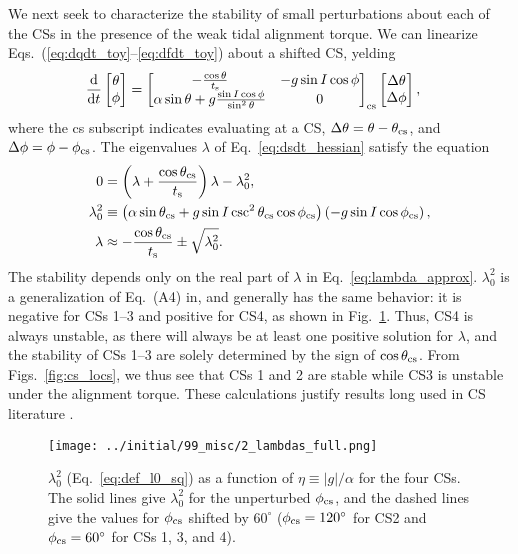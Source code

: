 \documentclass[
        fleqn,
        usenatbib,
    ]{mnras}
\newcommand*{\rd}[2]{\frac{\mathrm{d}#1}{\mathrm{d}#2}}
\newcommand*{\abs}[1]{\left|#1\right|}
\newcommand*{\p}[1]{\left(#1\right)}
\begin{document}
We next seek to characterize the stability of small perturbations about each of
the CSs in the presence of the weak tidal alignment torque. We can linearize
Eqs.~(\ref{eq:dqdt_toy}--\ref{eq:dfdt_toy}) about a shifted CS, yelding
\begin{align}
    \rd{}{t}\begin{bmatrix}
        \theta\\ \phi
    \end{bmatrix} &= \begin{bmatrix}
        -\frac{\cos \theta}{t_{\rm s}} &
        -g\sin I \cos \phi \\
        \alpha \sin \theta + g\frac{\sin I \cos \phi}{\sin^2\theta} &
        0
    \end{bmatrix}_{\rm cs}\begin{bmatrix}
        \Delta \theta \\ \Delta \phi
    \end{bmatrix},\label{eq:dsdt_hessian}
\end{align}
where the cs subscript indicates evaluating at a CS, $\Delta \theta = \theta -
\theta_{\rm cs}$, and $\Delta \phi = \phi - \phi_{\rm cs}$. The eigenvalues
$\lambda$ of Eq.~\eqref{eq:dsdt_hessian} satisfy the equation
\begin{align}
    0 &= \p{\lambda + \frac{\cos \theta_{\rm cs}}{t_{\rm s}}}\lambda - \lambda_0^2,\\
    \lambda_0^2 &\equiv \p{\alpha
        \sin \theta_{\rm cs} + g\sin I \csc^2\theta_{\rm cs}\cos \phi_{\rm cs}}
            \p{- g \sin I \cos \phi_{\rm cs}},\label{eq:def_l0_sq}\\
    \lambda &\approx -\frac{\cos \theta_{\rm cs}}{t_{\rm s}} \pm \sqrt{\lambda_0^2}.
        \label{eq:lambda_approx}
\end{align}
The stability depends only on the real part of $\lambda$ in
Eq.~\eqref{eq:lambda_approx}. $\lambda_0^2$ is a generalization of Eq.~(A4)
in, \citet{su2020} and generally has the same behavior: it is negative for CSs
1--3 and positive for CS4, as shown in Fig.~\ref{fig:lambda_full}. Thus, CS4 is
always unstable, as there will always be at least one positive solution for
$\lambda$, and the stability of CSs 1--3 are solely determined by the sign of
$\cos \theta_{\rm cs}$. From Figs.~\ref{fig:cs_locs}, we thus see that CSs 1 and
2 are stable while CS3 is unstable under the alignment torque. These
calculations justify results long used in CS literature
\citep[e.g.][]{ward1975tidal}.
\begin{figure}
    \centering
    \texttt{[image: ../initial/99\_misc/2\_lambdas\_full.png]}
    \caption{$\lambda_0^2$ (Eq.~\ref{eq:def_l0_sq}) as a function of $\eta
    \equiv \abs{g} / \alpha$ for the four CSs. The solid lines give
    $\lambda_0^2$ for the unperturbed $\phi_{\rm cs}$, and the dashed lines give
    the values for $\phi_{\rm cs}$ shifted by $60^\circ$ ($\phi_{\rm cs} =
    120^\circ$ for CS2 and $\phi_{\rm cs} = 60^\circ$ for CSs 1, 3, and 4).
    }\label{fig:lambda_full}
\end{figure}
\end{document}
